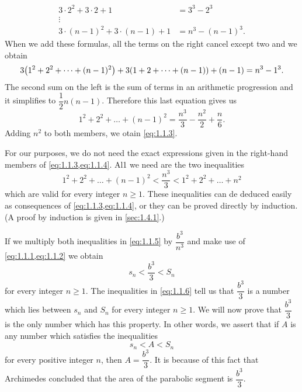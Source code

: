 \begin{note}
\begin{align*}
    3 \cdot 2^2 + 3 \cdot 2 + 1             & = 3^3 - 2^3        \\
    \vdots                                  &                    \\
    3 \cdot (n - 1)^2 + 3 \cdot (n - 1) + 1 & = n^3 - (n - 1)^3.
  \end{align*}
  When we add these formulas, all the terms on the right cancel except two and we obtain
  \[
    3 \pa{1^2 + 2^2 + \dots + (n - 1)^2} + 3 \pa{1 + 2 + \dots + (n - 1)} + (n - 1) = n^3 - 1^3.
  \]
  The second sum on the left is the sum of terms in an arithmetic progression and it simplifies to \(\dfrac{1}{2} n (n - 1)\).
  Therefore this last equation gives us
  \begin{equation}\label{eq:1.1.4}
    1^2 + 2^2 + \dots + (n - 1)^2 = \dfrac{n^3}{3} - \dfrac{n^2}{2} + \dfrac{n}{6}.
  \end{equation}
  Adding \(n^2\) to both members, we otain \cref{eq:1.1.3}.

  For our purposes, we do not need the exact expressions given in the right-hand members of \cref{eq:1.1.3,eq:1.1.4}.
  Al1 we need are the two inequalities
  \begin{equation}\label{eq:1.1.5}
    1^2 + 2^2 + \dots + (n - 1)^2 < \dfrac{n^3}{3} < 1^2 + 2^2 + \dots + n^2
  \end{equation}
  which are valid for every integer \(n \geq 1\).
  These inequalities can de deduced easily as consequences of \cref{eq:1.1.3,eq:1.1.4}, or they can be proved directly by induction.
  (A proof by induction is given in \cref{sec:1.4.1}.)

  If we multiply both inequalities in \cref{eq:1.1.5} by \(\dfrac{b^3}{n^3}\) and make use of \cref{eq:1.1.1,eq:1.1.2} we obtain
  \begin{equation}\label{eq:1.1.6}
    s_n < \dfrac{b^3}{3} < S_n
  \end{equation}
  for every integer \(n \geq 1\).
  The inequalities in \cref{eq:1.1.6} tell us that \(\dfrac{b^3}{3}\) is a number which lies between \(s_n\) and \(S_n\) for every integer \(n \geq 1\).
  We will now prove that \(\dfrac{b^3}{3}\) is the only number which has this property.
  In other words, we assert that if \(A\) is any number which satisfies the inequalities
  \begin{equation}\label{eq:1.1.7}
    s_n < A < S_n
  \end{equation}
  for every positive integer \(n\), then \(A = \dfrac{b^3}{3}\).
  It is because of this fact that Archimedes concluded that the area of the parabolic segment is \(\dfrac{b^3}{3}\).


\end{note}
